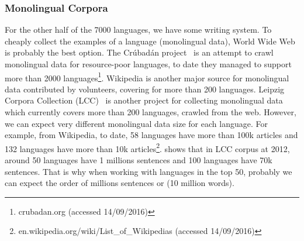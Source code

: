 \documentclass[12pt,twoside,final,hidelinks]{ltthesis}
\theoremstyle{definition}
\begin{document}
\subsubsection{Monolingual Corpora} 
For the other half of the 7000 languages, we have some writing system. To cheaply collect the examples of a language (monolingual data), World Wide Web is probably the best option. 
The Cr\'ubad\'an project~\cite{Scannell07thecrubadan} is an attempt to crawl
 monolingual data for resource-poor languages, to date they managed to support more than 2000 languages\footnote{crubadan.org (accessed 14/09/2016)}. Wikipedia is
  another major source for monolingual data contributed by volunteers, covering for more than 200 languages. Leipzig Corpora Collection (LCC)~\cite{GOLDHAHN12.327.L12-1154} is another project for
   collecting monolingual data which currently covers more than 200 languages, crawled from the web. 
However, we can expect very different monolingual data size for each language. For example, from Wikipedia, to date, 58 languages have more than 100k articles and 132 languages have more than 10k articles\footnote{en.wikipedia.org/wiki/List_of_Wikipedias (accessed 14/09/2016)}.
 shows that in LCC corpus at 2012, around 50 languages have 1 millions sentences and 100 languages have 70k sentences. That is why when working with languages in the top 50, probably we can expect the order of millions sentences or (10 million words). 



\end{document}
